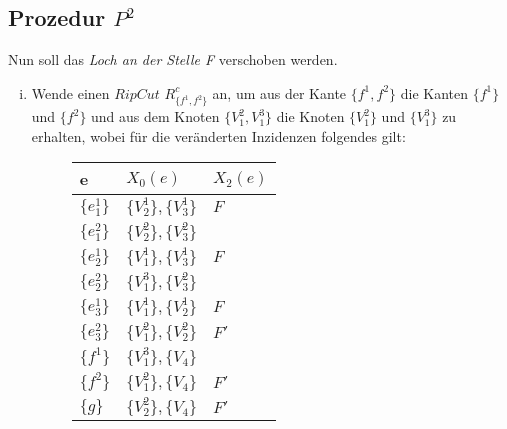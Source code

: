 \documentclass[12pt,titlepage]{article}
\begin{document}
\subsection{Prozedur $P^2$}
 Nun soll das \emph{Loch an der Stelle F} verschoben werden. 
\begin{enumerate}[(i)]

\item Wende einen $Rip Cut$ $R^{c}_{\{f^1,f^2\}}$ an, um aus der Kante $\{f^1,f^2\}$ die Kanten $\{f^1\}$ und $\{f^2\}$ und aus dem Knoten $\{V_1^2,V_1^3\}$ die Knoten $\{V_1^2\}$ und $\{V_1^3\}$ zu erhalten, wobei für die veränderten Inzidenzen folgendes gilt:
\begin{figure}[H]
\begin{center}
\begin{tabularx}{\textwidth}{XXX}
\hline
\textbf{e}&\textbf{$X_0(e)$}&\textbf{$X_2(e)$}\\
 \hline
 $\{e_1^1\}$ & $\{V_2^1\},\{V_3^1\}$& $F$\\
  $\{e_1^2\}$ & $\{V_2^2\},\{V_3^2\}$&\\ 
  $\{e_2^1\}$&$\{V_1^1\},\{V_3^1\}$ & $F$\\
   $\{e_2^2\}$&$\{V_1^3\},\{V_3^2\}$ & \\
  $\{e_3^1\}$&$\{V_1^1\},\{V_2^1\}$ & $F$\\
  $\{e_3^2\}$&$\{V_1^2\},\{V_2^2\}$ & $F'$\\ 
   $\{f^1\}$&$\{V_1^3\},\{V_4\}$& \\
    $\{f^2\}$&$\{V_1^2\},\{V_4\}$& $F'$\\
   $\{g\}$ & $\{V_2^2\},\{V_4\}$ & $F'$ \\
 \end{tabularx}
\end{center} 
\begin{tikzpicture}[line cap=round,line join=round,>=triangle 45,x=1.0cm,y=1.0cm]


\end{tikzpicture}
\end{figure}
\end{enumerate}
\end{document}
